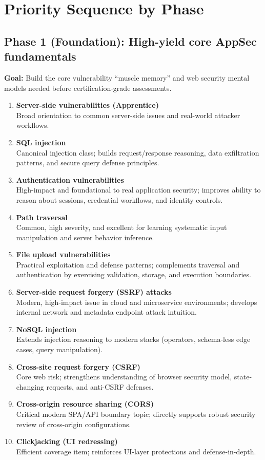 \documentclass[11pt]{article}
\begin{document}
\section{Priority Sequence by Phase}

\subsection{Phase 1 (Foundation): High-yield core AppSec fundamentals}
\textbf{Goal:} Build the core vulnerability ``muscle memory'' and web security mental models needed before certification-grade assessments.

\begin{enumerate}
  \item \textbf{Server-side vulnerabilities (Apprentice)}\\
  Broad orientation to common server-side issues and real-world attacker workflows.
  \item \textbf{SQL injection}\\
  Canonical injection class; builds request/response reasoning, data exfiltration patterns, and secure query defense principles.
  \item \textbf{Authentication vulnerabilities}\\
  High-impact and foundational to real application security; improves ability to reason about sessions, credential workflows, and identity controls.
  \item \textbf{Path traversal}\\
  Common, high severity, and excellent for learning systematic input manipulation and server behavior inference.
  \item \textbf{File upload vulnerabilities}\\
  Practical exploitation and defense patterns; complements traversal and authentication by exercising validation, storage, and execution boundaries.
  \item \textbf{Server-side request forgery (SSRF) attacks}\\
  Modern, high-impact issue in cloud and microservice environments; develops internal network and metadata endpoint attack intuition.
  \item \textbf{NoSQL injection}\\
  Extends injection reasoning to modern stacks (operators, schema-less edge cases, query manipulation).
  \item \textbf{Cross-site request forgery (CSRF)}\\
  Core web risk; strengthens understanding of browser security model, state-changing requests, and anti-CSRF defenses.
  \item \textbf{Cross-origin resource sharing (CORS)}\\
  Critical modern SPA/API boundary topic; directly supports robust security review of cross-origin configurations.
  \item \textbf{Clickjacking (UI redressing)}\\
  Efficient coverage item; reinforces UI-layer protections and defense-in-depth.
\end{enumerate}
\end{document}
